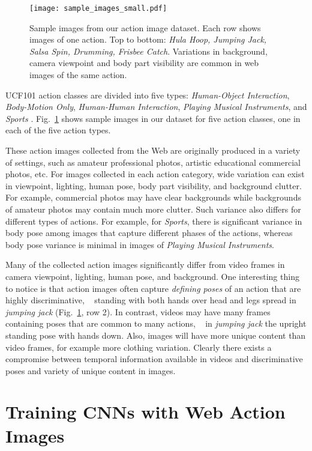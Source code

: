 \documentclass[10pt,twocolumn,letterpaper]{article}
\begin{document}
\begin{figure}[t]
  \center
  \texttt{[image: sample\_images\_small.pdf]}\\
  \caption{Sample images from our action image dataset. Each row shows images of one action. Top to bottom: {\em Hula Hoop, Jumping Jack, Salsa Spin, Drumming, Frisbee Catch}. Variations in background, camera viewpoint and body part visibility are common in web images of the same action.}
 \label{fig:imgSample}
\end{figure}

UCF101 action classes are divided into five types: {\em Human-Object Interaction},  {\em Body-Motion Only}, {\em Human-Human Interaction},  {\em Playing Musical Instruments}, and {\em Sports} \cite{soomro2012ucf101}. Fig.~\ref{fig:imgSample} shows sample images in our dataset for five action classes, one in each of the five action types. 

These action images collected from the Web are originally produced in a variety of settings, such as amateur \vs professional photos, artistic \vs educational \vs commercial photos, etc. For images collected in each action category, wide variation can exist in viewpoint, lighting, human pose, body part visibility, and background clutter. For example, commercial photos may have clear backgrounds while backgrounds of amateur photos may contain much more clutter. Such variance also differs for different types of actions. For example, for {\em Sports}, there is significant variance in body pose among images that capture different phases of the actions, whereas body pose variance is minimal in images of {\em Playing Musical Instruments}. 

Many of the collected action images significantly differ from video frames in camera viewpoint, lighting, human pose, and background. One interesting thing to notice is that action images often capture {\em defining poses} of an action that are highly discriminative, \eg~ standing with both hands over head and legs spread in {\em jumping jack} (Fig.~\ref{fig:imgSample}, row 2). In contrast, videos may have many frames containing poses that are common to many actions, \eg~ in {\em jumping jack} the upright standing pose with hands down. Also,  images will have more unique content than  video frames, for example more clothing variation. Clearly there exists a compromise between temporal information available in videos and discriminative poses and variety of unique content in images.

\section{Training CNNs with Web Action Images}
\label{sec:training}
\end{document}

